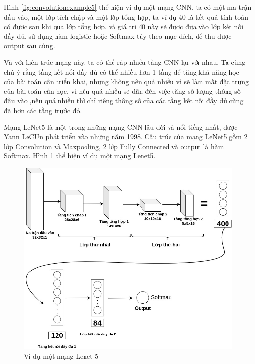 Hình \ref{fig:convolutionexample5} thể hiện ví dụ một mạng CNN, ta có một ma trận đầu vào, một lớp tích chập và một lớp tổng hợp, ta ví dụ 40 là kết quả tính toán có được sau khi qua lớp tổng hợp, và giá trị 40 này sẽ được đưa vào lớp kết nối đầy đủ, sử dụng hàm logistic hoặc Softmax tùy theo mục đích, để thu được output sau cùng.

Và với kiến trúc mạng này, ta có thể ráp nhiều tầng CNN lại với nhau. Ta cũng chú ý rằng tầng kết nối đầy đủ có thể nhiều hơn 1 tầng để tăng khả năng học của bài toán cần triển khai, nhưng không nên quá nhiều vì sẽ làm mất đặc trưng của bài toán cần học, vì nếu quá nhiều sẽ dẫn đến việc tăng số lượng thông số đầu vào ,nếu quá nhiều thì chỉ riêng thông số của các tầng kết nối đầy dủ cũng đã hơn các tầng trước đó.

Mạng LeNet5 là một trong những mạng CNN lâu đời và nổi tiếng nhất, được Yann LeCUn phát triển vào những năm 1998. Cấu trúc của mạng LeNet5 gồm 2 lớp Convolution và Maxpooling, 2 lớp Fully Connected và output là hàm Softmax. Hình \ref{fig:lenetexample} thể hiện ví dụ một mạng Lenet5.

\begin{figure}[!h]
	\centering
		\includegraphics[width=1\columnwidth]{books/artificial-neural-network/chapter05/figure/lenet-example.jpg}
        \caption{Ví dụ một mạng Lenet-5}
        \label{fig:lenetexample}
\end{figure}

